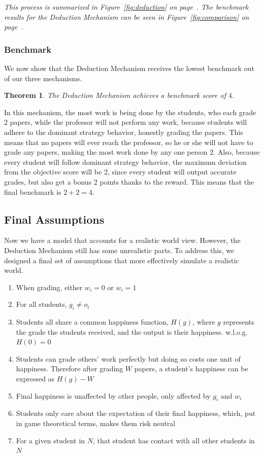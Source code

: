 \documentclass[12pt, Arial]{article}
\newtheorem{theorem}{Theorem}
\begin{document}
\noindent
\emph{This process is summarized in Figure~\ref{fig:deduction} on page~\pageref{fig:deduction}.}
\newline
\emph{The benchmark results for the Deduction Mechanism can be seen in Figure~\ref{fig:comparison} on page~\pageref{fig:comparison}.}
\subsubsection{Benchmark}
We now show that the Deduction Mechanism receives the lowest benchmark out of our three mechanisms.\\
\begin{theorem}
The Deduction Mechanism achieves a benchmark score of $4$.
\end{theorem}
In this mechanism, the most work is being done by the students, who each grade 2 papers, while the professor will not perform any work, because students will adhere to the dominant strategy behavior, honestly grading the papers. This means that no papers will ever reach the professor, so he or she will not have to grade any papers, making the most work done by any one person $2$. Also, because every student will follow dominant strategy behavior, the maximum deviation from the objective score will be 2, since every student will output accurate grades, but also get a bonus 2 points thanks to the reward. This means that the final benchmark is $2+2=4$.
\subsection{Final Assumptions}
Now we have a model that accounts for a realistic world view. However, the Deduction Mechanism still has some unrealistic parts. To address this, we designed a final set of assumptions that more effectively simulate a realistic world.

\begin{enumerate}[itemsep=0pt, parsep=0pt]
	\item When grading, either $w_i=0$ or $w_i=1$
	\item For all students, $g_i \neq o_i$
	\item Students all share a common happiness function, $H(g)$, where $g$ represents the grade the students received, and the output is their happiness. w.l.o.g. $H(0)=0$
	\item Students can grade others' work perfectly but doing so costs one unit of happiness. Therefore after grading $W$ papers, a student's happiness can be expressed as $H(g)-W$
	\item Final happiness is unaffected by other people, only affected by $g_i$ and $w_i$
	\item Students only care about the expectation of their final happiness, which, put in game theoretical terms, makes them risk neutral
	\item For a given student in $N$, that student has contact with all other students in $N$
\end{enumerate}
\end{document}
